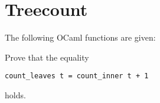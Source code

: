 \section{Treecount}

The following OCaml functions are given:



Prove that the equality
\begin{center}
    \begin{lstlisting}
count_leaves t = count_inner t + 1\end{lstlisting}
\end{center}
holds.

